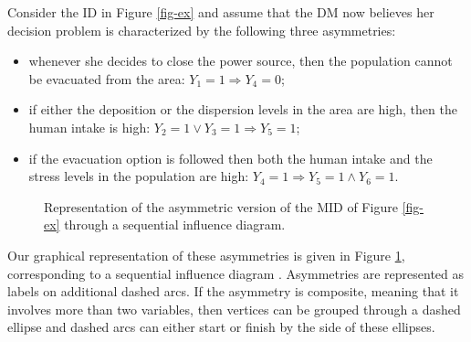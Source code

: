 \begin{example}
\label{eee}
Consider the \gls{ID} in Figure \ref{fig-ex} and assume that the \gls{DM} now believes her decision problem is characterized by the following three asymmetries:
\begin{itemize}
\item whenever she decides to close the power source, then the population cannot be evacuated from the area: $Y_1=1\Rightarrow Y_4=0$;
\item if either the deposition or the dispersion levels in the area are high, then  the human intake is high: $Y_2=1 \lor Y_3=1\Rightarrow Y_5=1$;
\item if the evacuation option is followed then both the human intake and the stress levels in the population are high: $Y_4=1\Rightarrow Y_5=1 \land Y_6=1$.
\end{itemize}

\begin{figure} 
\begin{center}
\end{center}
\caption{Representation of the asymmetric version of the MID of Figure \ref{fig-ex} through a sequential influence diagram. }\label{sid}
\end{figure}
Our graphical representation of these asymmetries is given in Figure \ref{sid}, corresponding to a sequential influence diagram \citep{Jensen2006}. Asymmetries are represented as labels on additional dashed arcs. If the asymmetry is composite, meaning that it involves more than two variables, then vertices can be grouped through a dashed ellipse and dashed arcs can either start or finish by the side of these ellipses. 
\end{example} 


